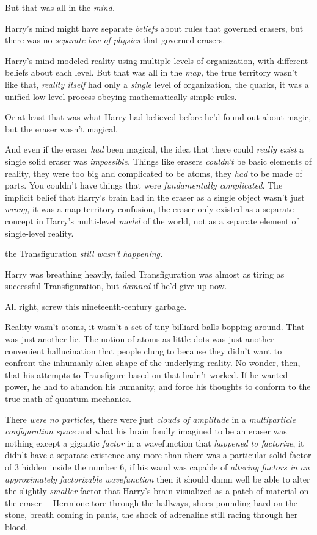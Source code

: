 But that was all in the \emph{mind.}

Harry's mind might have separate \emph{beliefs} about rules that governed
erasers, but there was no \emph{separate law of physics} that governed erasers.

Harry's mind modeled reality using multiple levels of organization, with
different beliefs about each level. But that was all in the \emph{map,} the
true territory wasn't like that, \emph{reality itself} had only a \emph{single}
level of organization, the quarks, it was a unified low-level process obeying
mathematically simple rules.

Or at least that was what Harry had believed before he'd found out about magic,
but the eraser wasn't magical.

And even if the eraser \emph{had} been magical, the idea that there could
\emph{really exist} a single solid eraser was \emph{impossible.} Things like
erasers \emph{couldn't} be basic elements of reality, they were too big and
complicated to be atoms, they \emph{had} to be made of parts. You
couldn't have things that were \emph{fundamentally complicated}. The implicit
belief that Harry's brain had in the eraser as a single object wasn't just
\emph{wrong,} it was a map-territory confusion, the eraser only existed as a
separate concept in Harry's multi-level \emph{model} of the world, not as a
separate element of single-level \mbox{reality}.

{\el} the Transfiguration \emph{still wasn't happening.}

Harry was breathing heavily, failed Transfiguration was almost as tiring as
successful Transfiguration, but \emph{damned} if he'd give up now.

All right, screw this nineteenth-century garbage.

Reality wasn't atoms, it wasn't a set of tiny billiard balls bopping around.
That was just another lie. The notion of atoms as little dots was just another
convenient hallucination that people clung to because they didn't want to
confront the inhumanly alien shape of the underlying reality. No wonder, then,
that his attempts to Transfigure based on that hadn't worked. If he wanted
power, he had to abandon his humanity, and force his thoughts to conform to the
true math of quantum mechanics.

There \emph{were no particles,} there were just \emph{clouds of amplitude} in a
\emph{multiparticle configuration space} and what his brain fondly imagined to
be an eraser was nothing except a gigantic \emph{factor} in a wavefunction that
\emph{happened to factorize}, it didn't have a separate existence any more than
there was a particular solid factor of 3 hidden inside the number 6, if his
wand was capable of \emph{altering factors in an approximately factorizable
wavefunction} then it should damn well be able to alter the slightly
\emph{smaller} factor that Harry's brain visualized as a patch of material on
the eraser---
\sbreak
Hermione tore through the hallways, shoes pounding hard on the stone, breath
coming in pants, the shock of adrenaline still racing through her blood.

